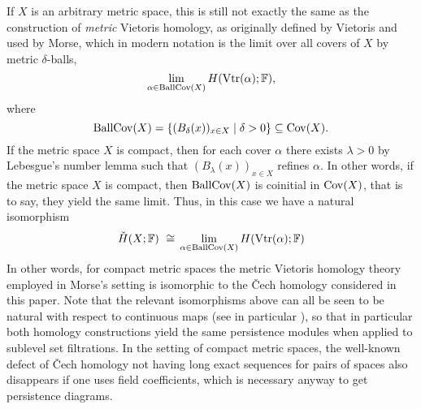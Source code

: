 If $X$ is an arbitrary metric space, this is still not exactly the same as the construction of \emph{metric} Vietoris homology, as originally defined by Vietoris \cite{Vietoris.1927} and used by Morse, which in modern notation is the limit over all covers of $X$ by metric $\delta$-balls,
\begin{equation*}
\lim_{\alpha \in \operatorname{BallCov}(X)} H (\operatorname{Vtr} (\alpha); \mathbb{F}),
\end{equation*}
where
\begin{equation*}
\operatorname{BallCov} (X) = \left\{ ( B_{\delta} (x) )_{x \in X} \mid \delta > 0 \right\}
\subseteq \operatorname{Cov} (X).
\end{equation*}
If the metric space $X$ is compact, then for each cover $\alpha$ there exists $\lambda > 0$ by Lebesgue's number lemma \cite[Lemma 27.5]{Munkres.2000} such that $(B_{\lambda}(x))_{x \in X}$ refines $\alpha$.
In other words, if the metric space $X$ is compact, then $\operatorname{BallCov} (X)$ is coinitial in $\operatorname{Cov} (X)$, that is to say, they yield the same limit.
Thus, in this case we have a natural isomorphism
\begin{equation*}
\check{H} (X; \mathbb{F}) \ \cong \,
\lim_{\alpha \in \operatorname{BallCov}(X)} H (\operatorname{Vtr} (\alpha); \mathbb{F})
\end{equation*}
In other words, for compact metric spaces the metric Vietoris homology theory employed in Morse's setting is isomorphic to the \v{C}ech homology considered in this paper.
Note that the relevant isomorphisms above can all be seen to be natural with respect to continuous maps (see in particular \cite[Lemma 7a]{Dowker.1952}), so that in particular both homology constructions yield the same persistence modules when applied to sublevel set filtrations.
In the setting of compact metric spaces, the well-known defect of \v{C}ech homology not having long exact sequences for pairs of spaces also disappears if one uses field coefficients, which is necessary anyway to get persistence diagrams.
